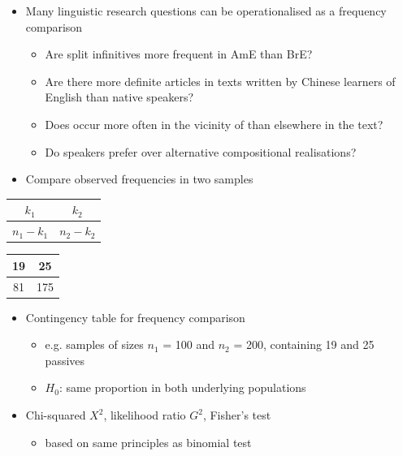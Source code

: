 \documentclass[a4paper,landscape,headrule,footrule,xetex]{foils}
\begin{document}
\begin{itemize}
\item Many linguistic research questions can be
operationalised as a frequency comparison
\begin{itemize}
\item Are split infinitives more frequent in AmE than BrE?
\item Are there more definite articles in texts written by
Chinese learners of English than native speakers?
\item Does  occur more often in the vicinity of 
than elsewhere in the text?
\item Do speakers prefer  over
alternative compositional realisations?
\end{itemize}
\item Compare observed frequencies in two samples
\end{itemize}



\begin{tabular}{|c|c|}
\hline
  $k_1 $ & $k_2 $ \\
\hline
  $n_1 - k_1 $ & $n_2 - k_2 $ \\
\hline
\end{tabular}
\begin{tabular}{|c|c|}
\hline
  19 & 25 \\
\hline
  81 & 175 \\ 
\hline
\end{tabular}

\begin{itemize}
\item Contingency table for frequency comparison
\begin{itemize}
\item e.g. samples of sizes $n_1$ = 100 and $n_2$ = 200,
containing 19 and 25 passives
\item $H_0$: same proportion in both underlying populations
\end{itemize}
\item Chi-squared $X^2$, likelihood ratio $G^2$, Fisher's test
  \begin{itemize}
  \item based on same principles as binomial test
  \end{itemize}
\end{itemize}
\end{document}
